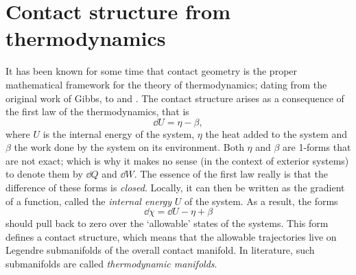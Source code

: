 \section{Contact structure from thermodynamics}
It has been known for some time that contact geometry is the proper mathematical framework for the theory of thermodynamics; dating from the original work of Gibbs, to \citet{Arnold1989b} and \citet{Hermann1973}. The contact structure arises as a consequence of the first law of the thermodynamics, that is
\begin{equation}
    \dd{U} = \eta - \beta,
\end{equation}
where $U$ is the internal energy of the system, $\eta$ the heat added to the system and $\beta$ the work done by the system on its environment. Both $\eta$ and $\beta$ are 1-forms that are not exact; which is why it makes no sense (in the context of exterior systems) to denote them by $\dd{Q}$ and $\dd{W}$. The essence of the first law really is that the difference of these forms is \emph{closed}. Locally, it can then be written as the gradient of a function, called the \emph{internal energy} $U$ of the system. As a result, the forms 
$$ \dd{\chi} = \dd{U} - \eta + \beta $$
should pull back to zero over the `allowable' states of the systems. This form defines a contact structure, which means that the allowable trajectories live on Legendre submanifolds of the overall contact manifold. \cite{Frankel2012,Bamberg1988} In literature, such submanifolds are called \emph{thermodynamic manifolds}.

